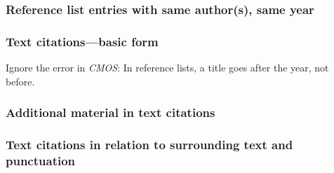 \documentclass[11pt,letterpaper,oneside]{article}
\begin{document}
\setcounter{subsubsection}{19}
\subsubsection{Reference list entries with same author(s), same year}
\label{15.20}

\begin{citeref}
\item \parencite[218]{fogel2004b}
\item \parencite[45--46]{fogel2004a}
\end{citeref}

\setcounter{subsubsection}{21}
\subsubsection{Text citations---basic form}
\label{15.22}

Ignore the error in \textit{CMOS}: In reference lists, a title goes
after the year, not before.

\begin{citeref}
\item \parencite{hetherington2015}
\item \parencite{grove2015}
\item \parencite{hetherington2015,grove2015}
\end{citeref}

\begin{citeref}
\item \parencite{doershuk2017}
\item \parencite{doershuk2016}
\end{citeref}

\setcounter{subsubsection}{23}
\subsubsection{Additional material in text citations}

\begin{citeref}
\item \parencite[; t-tests are used here]{mandolan2017}
\end{citeref}

\subsubsection{Text citations in relation to surrounding text and punctuation}
\label{15.25}
\end{document}
